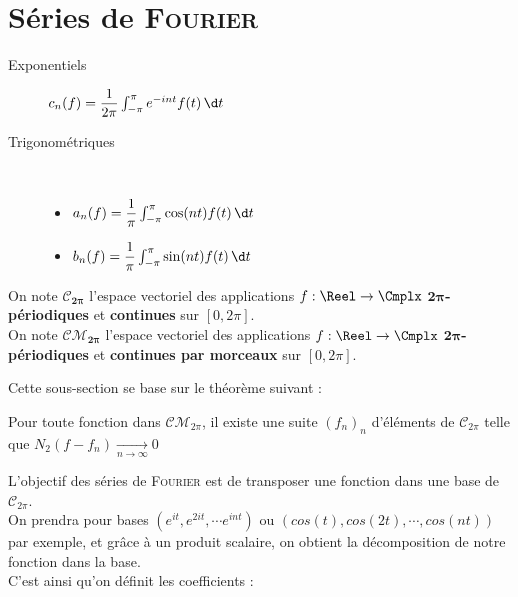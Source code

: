 \documentclass[11pt,a4paper,fleqn,pdftex]{report}
\begin{document}
\section{Séries de \textsc{Fourier}}
\begin{methode}
\begin{description}
\item[Exponentiels] $c_n(f) = \dfrac{1}{2\pi} \int_{-\pi}^{\pi}e^{-int} f(t)\, \d t$
\item[Trigonométriques] \hfill \\[-10pt]
    \begin{itemize}\itemsep2pt
        \item $a_n(f) = \dfrac{1}{\pi} \int_{-\pi}^{\pi} \cos (nt) f(t)\, \d t$
        \item $b_n(f) = \dfrac{1}{\pi} \int_{-\pi}^{\pi} \sin (nt) f(t)\, \d t$
    \end{itemize}
\end{description}
\end{methode}
On note $\boldsymbol{ \mathcal{C}_{2\pi}}$ l'espace vectoriel des applications $f : \Reel \to \Cmplx$ \textbf{{$\boldsymbol{ 2\pi}$-périodiques}} et \textbf{continues} sur $[0,2\pi]$.\\
On note $\boldsymbol{ \mathcal{CM}_{2\pi}}$ l'espace vectoriel des applications $f : \Reel \to \Cmplx$ \textbf{{$\boldsymbol{ 2\pi}$-périodiques}} et \textbf{continues par morceaux} sur $[0,2\pi]$.\\[3pt]

Cette sous-section se base sur le théorème suivant : 
\begin{theorem}
Pour toute fonction dans $\mathcal{CM}_{2\pi}$, il existe une suite $\left( f_n \right)_n$ d'éléments de $\mathcal{C}_{2\pi}$ telle que $\boxed{N_2(f-f_n)\xrightarrow[n\to\infty]{} 0}$
\end{theorem}

L'objectif des séries de \textsc{Fourier} est de \og transposer \fg une fonction dans une base de $\mathcal{C}_{2\pi}$. \\

On prendra pour bases $(e^{it},e^{2it},\cdots e^{int})$ ou $\left( cos(t),cos(2t),\cdots ,cos(nt)\right)$ par exemple, et grâce à un produit scalaire, on obtient la décomposition de notre fonction dans la base.\\
C'est ainsi qu'on définit les coefficients : 
\end{document}
